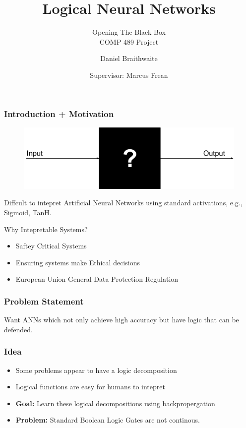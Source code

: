\documentclass{beamer}
\title{Logical Neural Networks}
\subtitle{Opening The Black Box\\
\vspace{0.5cm}
\small COMP 489 Project
}
\author{Daniel Braithwaite}
\date{Supervisor: Marcus Frean}
\begin{document}
\begin{frame}
\titlepage
\end{frame}

\begin{frame}
\frametitle{Introduction + Motivation}

\begin{figure}
\centering
	\begin{minipage}[b]{0.8\textwidth}
		\includegraphics[width=\textwidth]{Images/BlackBox.png}
	\end{minipage}
	\hfill
\end{figure}

Diffcult to intepret Artificial Neural Networks using standard activations, e.g., Sigmoid, TanH.

\begin{block}{Why Intepretable Systems?}
\begin{itemize}
\item Saftey Critical Systems
\item Ensuring systems make Ethical decisions
\item European Union General Data Protection Regulation
\end{itemize}
\end{block}
\end{frame}

\begin{frame}
\frametitle{Problem Statement}

Want ANNs which not only achieve high accuracy but have logic that can be defended.

\end{frame}

\begin{frame}
\frametitle{Idea}

\begin{itemize}
\item Some problems appear to have a logic decomposition 
\item Logical functions are easy for humans to intepret
\item \textbf{Goal:} Learn these logical decompositions using backpropergation
\item \textbf{Problem:} Standard Boolean Logic Gates are not continous.
\end{itemize}

\end{frame}
\end{document}
